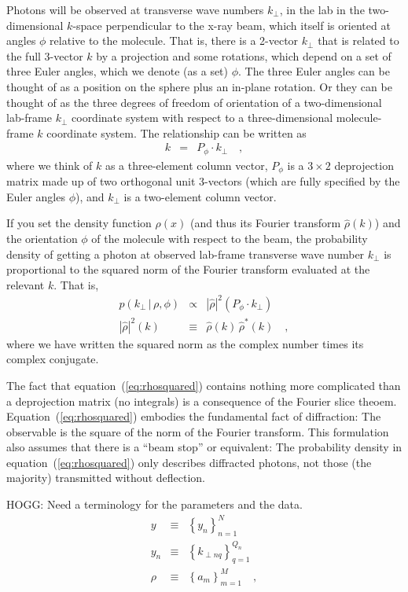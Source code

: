 \documentclass[12pt]{article}
\newcommand{\setof}[1]{\left\{{#1}\right\}}
\newcommand{\given}{\,|\,}
\begin{document}
Photons will be observed at transverse wave numbers $k_\perp$, in the
lab in the two-dimensional $k$-space perpendicular to the x-ray beam,
which itself is oriented at angles $\phi$ relative to the molecule.
That is, there is a 2-vector $k_\perp$ that is related to the full
3-vector $k$ by a projection and some rotations, which depend on a set
of three Euler angles, which we denote (as a set) $\phi$.
The three Euler angles can be thought of as a position on the sphere
plus an in-plane rotation.
Or they can be thought of as the three degrees of freedom of
orientation of a two-dimensional lab-frame $k_\perp$ coordinate system
with respect to a three-dimensional molecule-frame $k$ coordinate
system.
The relationship can be written as
\begin{eqnarray}
  k &=& P_\phi \cdot k_\perp
  \quad ,
\end{eqnarray}
where we think of $k$ as a three-element column vector, $P_\phi$ is a
$3\times 2$ deprojection matrix made up of two orthogonal unit
3-vectors (which are fully specified by the Euler angles $\phi$), and
$k_\perp$ is a two-element column vector.

If you set the density function $\rho(x)$ (and thus its Fourier
transform $\hat{\rho}(k)$) and the orientation $\phi$ of the molecule
with respect to the beam, the probability density of getting a photon
at observed lab-frame transverse wave number $k_\perp$ is proportional
to the squared norm of the Fourier transform evaluated at the relevant
$k$.  That is,
\begin{eqnarray}
  p(k_\perp\given\rho,\phi) &\propto& |\hat{\rho}|^2(P_\phi \cdot k_\perp)
  \label{eq:rhosquared} \\
  |\hat{\rho}|^2(k) &\equiv& \hat{\rho}(k)\,\hat{\rho}^{\ast}(k)
  \quad ,
\end{eqnarray}
where we have written the squared norm as the complex number times its
complex conjugate.

The fact that equation~(\ref{eq:rhosquared}) contains nothing more
complicated than a deprojection matrix (no integrals) is a consequence
of the Fourier slice theoem.
Equation~(\ref{eq:rhosquared}) embodies the fundamental fact of
diffraction: The observable is the square of the norm of the Fourier
transform.
This formulation also assumes that there is a ``beam stop'' or
equivalent: The probability density in equation~(\ref{eq:rhosquared})
only describes diffracted photons, not those (the majority)
transmitted without deflection.

HOGG: Need a terminology for the parameters and the data.
\begin{eqnarray}
  y &\equiv& \setof{y_n}_{n=1}^N
  \\
  y_n &\equiv& \setof{k_{\perp nq}}_{q=1}^{Q_n}
  \\
  \rho &\equiv& \setof{a_m}_{m=1}^M
  \quad,
\end{eqnarray}
\end{document}
